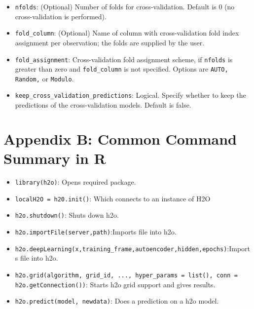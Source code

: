 \begin{itemize}
\item \texttt{nfolds}: (Optional) Number of folds for cross-validation. %
Default is 0 (no cross-validation is performed).

\item \texttt{fold\_column}: (Optional) Name of column with cross-validation fold index assignment per observation; the folds are supplied by the user. 

\item \texttt{fold\_assignment}: Cross-validation fold assignment scheme, if \texttt{nfolds} is greater than zero and \texttt{fold\_column} is not specified. Options are \texttt{AUTO, Random,} or \texttt{Modulo}. 

\item \texttt{keep\_cross\_validation\_predictions}: Logical.  Specify whether to keep the predictions of the cross-validation models.  Default is false.

\end{itemize}

\newpage

\section{Appendix B: Common Command Summary in R}
\begin{itemize}

\item \texttt{library(h2o)}: Opens required package.

\item \texttt{localH2O = h20.init()}: Which connects to an instance of H2O

\item \texttt{h2o.shutdown()}: Shuts down h2o.

\item \texttt{h2o.importFile(server,path)}:Imports file into h2o.

\item \texttt{h2o.deepLearning(x,training_frame,autoencoder,hidden,epochs)}:Imports file into h2o.

\item \texttt{h2o.grid(algorithm, grid_id, ..., hyper_params = list(), conn = h2o.getConnection())}: Starts h2o grid support and gives results.

\item \texttt{h2o.predict(model, newdata)}: Does a prediction on a h2o model.

\end{itemize}

